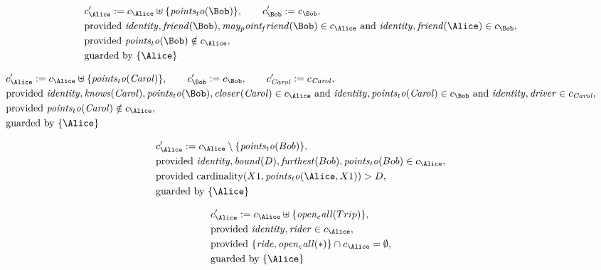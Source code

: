 \begin{align*}
&
c'_
{
\Alice
}
 := 
c_
{
\Alice
}
 \uplus 
\{
\mathit{
points_to
}
(
\Bob
)
\}
, \qquad 
c'_
{
\Bob
}
 := 
c_
{
\Bob
}
,\\
&
\text{provided } 
\mathit{
identity
}
,
\mathit{
friend
}
(
\Bob
)
,
\mathit{
may_point_friend
}
(
\Bob
)
 \in c_
{
\Alice
}
 \text{ and } 
\mathit{
identity
}
,
\mathit{
friend
}
(
\Alice
)
 \in c_
{
\Bob
}
,\\
&
\text{provided } 
\mathit{
points_to
}
(
\Bob
)
 \notin c_
{
\Alice
}
,\\
&
\text{guarded by } \{
\Alice
\}
\end{align*}

\begin{align*}
&
c'_
{
\Alice
}
 := 
c_
{
\Alice
}
 \uplus 
\{
\mathit{
points_to
}
(
\mathit{Carol}
)
\}
, \qquad 
c'_
{
\Bob
}
 := 
c_
{
\Bob
}
, \qquad 
c'_
{
\mathit{Carol}
}
 := 
c_
{
\mathit{Carol}
}
,\\
&
\text{provided } 
\mathit{
identity
}
,
\mathit{
knows
}
(
\mathit{Carol}
)
,
\mathit{
points_to
}
(
\Bob
)
,
\mathit{
closer
}
(
\mathit{Carol}
)
 \in c_
{
\Alice
}
 \text{ and } 
\mathit{
identity
}
,
\mathit{
points_to
}
(
\mathit{Carol}
)
 \in c_
{
\Bob
}
 \text{ and } 
\mathit{
identity
}
,
\mathit{
driver
}
 \in c_
{
\mathit{Carol}
}
,\\
&
\text{provided } 
\mathit{
points_to
}
(
\mathit{Carol}
)
 \notin c_
{
\Alice
}
,\\
&
\text{guarded by } \{
\Alice
\}
\end{align*}

\begin{align*}
&
c'_
{
\Alice
}
 := 
c_
{
\Alice
}
 \setminus 
\{
\mathit{
points_to
}
(
Bob
)
\}
,\\
&
\text{provided } 
\mathit{
identity
}
,
\mathit{
bound
}
(
D
)
,
\mathit{
furthest
}
(
Bob
)
,
\mathit{
points_to
}
(
Bob
)
 \in c_
{
\Alice
}
,\\
&
\text{provided } 
\mathrm{cardinality}(
X1
,
\mathit{
points_to
}
(
\Alice
,
X1
)
)
>
D
,\\
&
\text{guarded by } \{
\Alice
\}
\end{align*}

\begin{align*}
&
c'_
{
\Alice
}
 := 
c_
{
\Alice
}
 \uplus 
\{
\mathit{
open_call
}
(
Trip
)
\}
,\\
&
\text{provided } 
\mathit{
identity
}
,
\mathit{
rider
}
 \in c_
{
\Alice
}
,\\
&
\text{provided } 
\{
\mathit{
ride
}
,
\mathit{
open_call
}
(
\ast
)
\}
 \cap c_
{
\Alice
}
 = \emptyset
,\\
&
\text{guarded by } \{
\Alice
\}
\end{align*}
